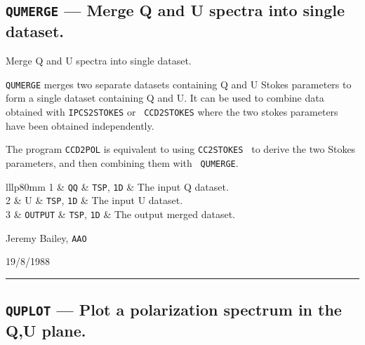 \documentclass[11pt,twoside]{article}
\makeatletter
\renewcommand{\_}{\texttt{\symbol{95}}}
\newcommand{\manrule}{\rule{\textwidth}{0.5mm}}
\newcommand{\manroutine}[3]{\subsection{#1 --- #2}}
\newenvironment{manroutinedescription}{\begin{description}}{\end{description}%
\manrule}
\newcommand{\manroutineitem}[2]{\item[#1:] #2\mbox{}}
\newcommand{\manparametercols}{lllp{80mm}}
\newcommand{\manparameterorder}[3]{#1 & #2 & #3 & }
\newcommand{\manparametertop}{}
\newcommand{\manparameterbottom}{}
\newenvironment{manparametertable}{\gdef\manparameter@ss{}%
\gdef\manparameter@hl{}\hspace*{\fill}\vspace*{-\partopsep}\begin{trivlist}%
\item[]\begin{tabular}{\manparametercols}\manparametertop}{\manparameterbottom%
\end{tabular}\end{trivlist}}
\newcommand{\manparameterentry}[3]{\manparameter@ss\gdef\manparameter@ss{\\}%
\gdef\manparameter@hl{\hline}\manparameterorder{#1}{#2}{#3}}
\newcommand{\mantt}{\tt}
\makeatother
\begin{document}
\manroutine{{\mantt{QUMERGE}}}{Merge Q and U spectra into single dataset.}{%
QUMERGE}
\begin{manroutinedescription}
\manroutineitem{Function}{}
        Merge Q and U spectra into single dataset.

\manroutineitem{Description}{}
        {\mantt{QUMERGE}} merges two separate datasets containing Q and U Stokes
        parameters to form a single dataset containing Q and U. It can
        be used to combine data obtained with {\mantt{IPCS2STOKES}} or {\mantt{%
CCD2STOKES}}
        where the two stokes parameters have been obtained independently.

        The program {\mantt{CCD2POL}} is equivalent to using {\mantt{CC2STOKES}%
} to derive
        the two Stokes parameters, and then combining them with {\mantt{%
QUMERGE}}.

\manroutineitem{Parameters}{}
\begin{manparametertable}
\manparameterentry{1}{{\mantt{QQ}}}{{\mantt{TSP}}, {\mantt{1D}}}  The input Q %
dataset.
\manparameterentry{2}{U}{{\mantt{TSP}}, {\mantt{1D}}}  The input U dataset.
\manparameterentry{3}{{\mantt{OUTPUT}}}{{\mantt{TSP}}, {\mantt{1D}}}  The %
output merged dataset.

\end{manparametertable}
\manroutineitem{Support}{}
         Jeremy Bailey, {\mantt{AAO}}

\manroutineitem{Version date}{}
         19/8/1988

\end{manroutinedescription}
\manroutine{{\mantt{QUPLOT}}}{Plot a polarization spectrum in the Q,U plane.}{%
QUPLOT}
\end{document}
